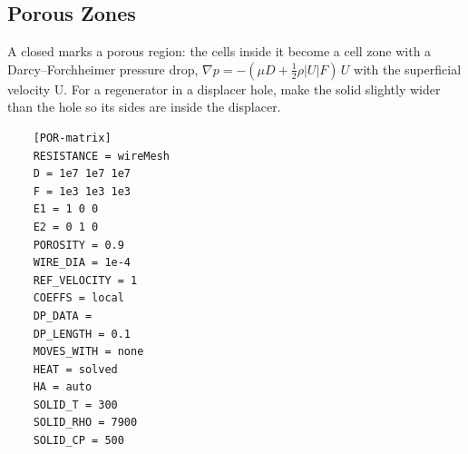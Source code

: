 \subsection{Porous Zones}\label{sec:porous}
A closed  marks a porous region: the cells inside it become a cell zone with a Darcy--Forchheimer pressure drop, $\nabla p = -(\mu D + \frac{1}{2}\rho |U| F)\,U$ with the superficial velocity U. For a regenerator in a displacer hole, make the solid slightly wider than the hole so its sides are inside the displacer.
\begin{lstlisting}
    [POR-matrix]
    RESISTANCE = wireMesh
    D = 1e7 1e7 1e7
    F = 1e3 1e3 1e3
    E1 = 1 0 0
    E2 = 0 1 0
    POROSITY = 0.9
    WIRE_DIA = 1e-4
    REF_VELOCITY = 1
    COEFFS = local
    DP_DATA =
    DP_LENGTH = 0.1
    MOVES_WITH = none
    HEAT = solved
    HA = auto
    SOLID_T = 300
    SOLID_RHO = 7900
    SOLID_CP = 500
\end{lstlisting}

